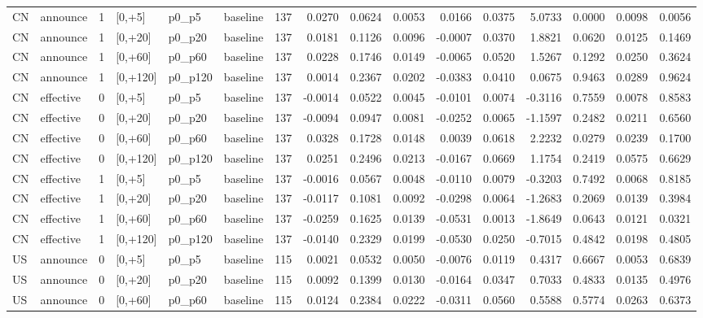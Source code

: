 \begin{tabular}{llrlllrrrrrrrrrr}
CN & announce & 1 & [0,+5] & p0_p5 & baseline & 137 & 0.0270 & 0.0624 & 0.0053 & 0.0166 & 0.0375 & 5.0733 & 0.0000 & 0.0098 & 0.0056 \\
CN & announce & 1 & [0,+20] & p0_p20 & baseline & 137 & 0.0181 & 0.1126 & 0.0096 & -0.0007 & 0.0370 & 1.8821 & 0.0620 & 0.0125 & 0.1469 \\
CN & announce & 1 & [0,+60] & p0_p60 & baseline & 137 & 0.0228 & 0.1746 & 0.0149 & -0.0065 & 0.0520 & 1.5267 & 0.1292 & 0.0250 & 0.3624 \\
CN & announce & 1 & [0,+120] & p0_p120 & baseline & 137 & 0.0014 & 0.2367 & 0.0202 & -0.0383 & 0.0410 & 0.0675 & 0.9463 & 0.0289 & 0.9624 \\
CN & effective & 0 & [0,+5] & p0_p5 & baseline & 137 & -0.0014 & 0.0522 & 0.0045 & -0.0101 & 0.0074 & -0.3116 & 0.7559 & 0.0078 & 0.8583 \\
CN & effective & 0 & [0,+20] & p0_p20 & baseline & 137 & -0.0094 & 0.0947 & 0.0081 & -0.0252 & 0.0065 & -1.1597 & 0.2482 & 0.0211 & 0.6560 \\
CN & effective & 0 & [0,+60] & p0_p60 & baseline & 137 & 0.0328 & 0.1728 & 0.0148 & 0.0039 & 0.0618 & 2.2232 & 0.0279 & 0.0239 & 0.1700 \\
CN & effective & 0 & [0,+120] & p0_p120 & baseline & 137 & 0.0251 & 0.2496 & 0.0213 & -0.0167 & 0.0669 & 1.1754 & 0.2419 & 0.0575 & 0.6629 \\
CN & effective & 1 & [0,+5] & p0_p5 & baseline & 137 & -0.0016 & 0.0567 & 0.0048 & -0.0110 & 0.0079 & -0.3203 & 0.7492 & 0.0068 & 0.8185 \\
CN & effective & 1 & [0,+20] & p0_p20 & baseline & 137 & -0.0117 & 0.1081 & 0.0092 & -0.0298 & 0.0064 & -1.2683 & 0.2069 & 0.0139 & 0.3984 \\
CN & effective & 1 & [0,+60] & p0_p60 & baseline & 137 & -0.0259 & 0.1625 & 0.0139 & -0.0531 & 0.0013 & -1.8649 & 0.0643 & 0.0121 & 0.0321 \\
CN & effective & 1 & [0,+120] & p0_p120 & baseline & 137 & -0.0140 & 0.2329 & 0.0199 & -0.0530 & 0.0250 & -0.7015 & 0.4842 & 0.0198 & 0.4805 \\
US & announce & 0 & [0,+5] & p0_p5 & baseline & 115 & 0.0021 & 0.0532 & 0.0050 & -0.0076 & 0.0119 & 0.4317 & 0.6667 & 0.0053 & 0.6839 \\
US & announce & 0 & [0,+20] & p0_p20 & baseline & 115 & 0.0092 & 0.1399 & 0.0130 & -0.0164 & 0.0347 & 0.7033 & 0.4833 & 0.0135 & 0.4976 \\
US & announce & 0 & [0,+60] & p0_p60 & baseline & 115 & 0.0124 & 0.2384 & 0.0222 & -0.0311 & 0.0560 & 0.5588 & 0.5774 & 0.0263 & 0.6373 \\

\end{tabular}

